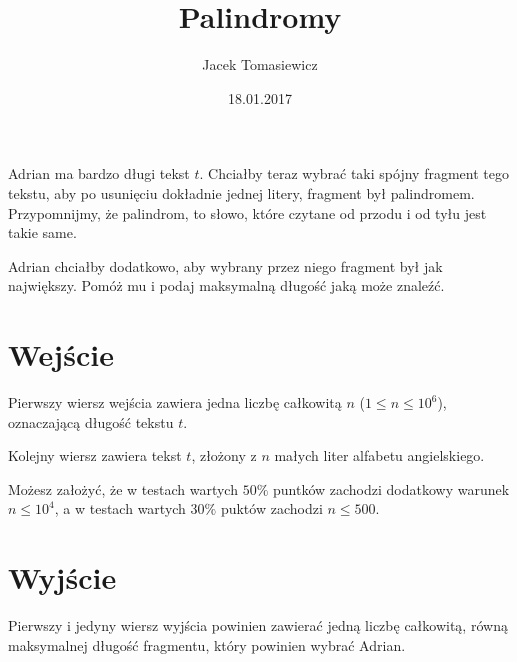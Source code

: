\documentclass[zad,zawodnik,utf8]{sinol}
\title{Palindromy}
\author{Jacek Tomasiewicz} %
\date{18.01.2017}
\begin{document}
  \begin{tasktext}%
Adrian ma bardzo długi tekst $t$. Chciałby teraz wybrać taki spójny fragment tego tekstu, aby po usunięciu dokładnie jednej litery, fragment był palindromem. Przypomnijmy, że palindrom, to słowo, które czytane od przodu i od tyłu jest takie same.

Adrian chciałby dodatkowo, aby wybrany przez niego fragment był jak największy. Pomóż mu i podaj maksymalną długość jaką może znaleźć.

  \section{Wejście}
Pierwszy wiersz wejścia zawiera jedna liczbę całkowitą $n$ ($1 \leq n \leq 10^6$), oznaczającą długość tekstu $t$.

Kolejny wiersz zawiera tekst $t$, złożony z $n$ małych liter alfabetu angielskiego.

Możesz założyć, że w testach wartych $50\%$ puntków zachodzi dodatkowy warunek $n \leq 10^4$, a w testach wartych $30\%$ puktów zachodzi $n \leq 500$.

  \section{Wyjście}
Pierwszy i jedyny wiersz wyjścia powinien zawierać jedną liczbę całkowitą, równą maksymalnej długość fragmentu, który powinien wybrać Adrian.

     \makecompactexample    

  \end{tasktext}
\end{document}
